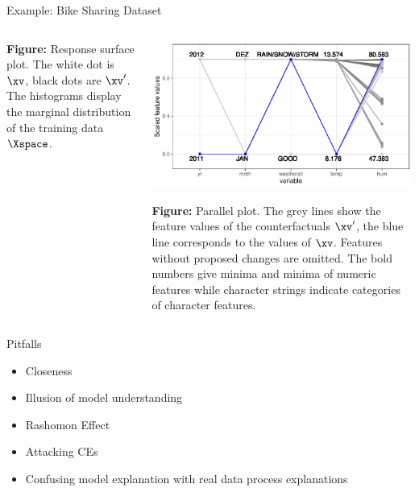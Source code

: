 \documentclass[11pt,compress,t,notes=noshow, xcolor=table]{beamer}
\begin{document}
\begin{vbframe}{Example: Bike Sharing Dataset}
\begin{columns}
\begin{column}{0.5\textwidth}
			\scriptsize{\textbf{Figure:} Response surface plot. 
				The white dot is $\xv$, black dots are $\xv'$. The histograms display the marginal distribution of the training data $\Xspace$.} 
				
		\end{column}
		\begin{column}{0.5\textwidth}  
			\begin{center}
				\includegraphics[width=1\textwidth]{figure/counterfactuals_bike_para}
			\end{center}
		
		\scriptsize{\textbf{Figure:} Parallel plot. 
			The grey lines show the feature values of the counterfactuals $\xv'$, the blue line corresponds to the values of $\xv$. Features without proposed changes are omitted. The bold numbers give minima and minima of numeric features while character strings indicate categories of character features.} 
		
		\end{column}
	\end{columns}
\end{vbframe}

\begin{vbframe}{Pitfalls}
	\begin{itemize}
		\item Closeness
		\item Illusion of model understanding
		\item Rashomon Effect
		\item Attacking CEs
		\item Confusing model explanation with real data process explanations
	\end{itemize}
\end{vbframe}
	
\endlecture
\end{document}

